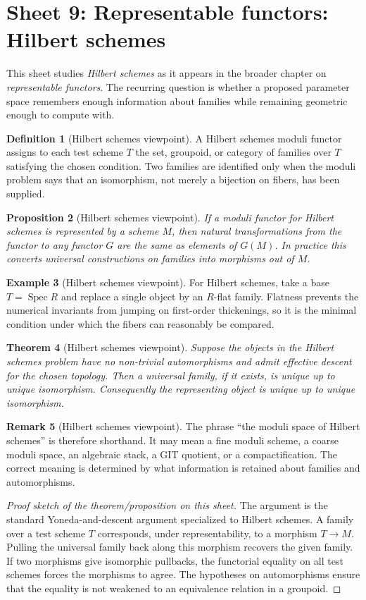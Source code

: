\documentclass[11pt]{amsart}
\newtheorem{theorem}{Theorem}[section]
\newtheorem{proposition}[theorem]{Proposition}
\theoremstyle{definition}
\newtheorem{definition}[theorem]{Definition}
\newtheorem{example}[theorem]{Example}
\newtheorem{remark}[theorem]{Remark}
\newcommand{\Spec}{\operatorname{Spec}}
\begin{document}
\section{Sheet 9: Representable functors: Hilbert schemes}
This sheet studies \emph{Hilbert schemes} as it appears in the broader chapter on \emph{representable functors}.  The recurring question is whether a proposed parameter space remembers enough information about families while remaining geometric enough to compute with.
\begin{definition}[Hilbert schemes viewpoint]
A Hilbert schemes moduli functor assigns to each test scheme $T$ the set, groupoid, or category of families over $T$ satisfying the chosen condition.  Two families are identified only when the moduli problem says that an isomorphism, not merely a bijection on fibers, has been supplied.
\end{definition}
\begin{proposition}[Hilbert schemes viewpoint]
If a moduli functor for Hilbert schemes is represented by a scheme $M$, then natural transformations from the functor to any functor $G$ are the same as elements of $G(M)$.  In practice this converts universal constructions on families into morphisms out of $M$.
\end{proposition}
\begin{example}[Hilbert schemes viewpoint]
For Hilbert schemes, take a base $T=\Spec R$ and replace a single object by an $R$-flat family.  Flatness prevents the numerical invariants from jumping on first-order thickenings, so it is the minimal condition under which the fibers can reasonably be compared.
\end{example}
\begin{theorem}[Hilbert schemes viewpoint]
Suppose the objects in the Hilbert schemes problem have no non-trivial automorphisms and admit effective descent for the chosen topology.  Then a universal family, if it exists, is unique up to unique isomorphism.  Consequently the representing object is unique up to unique isomorphism.
\end{theorem}
\begin{remark}[Hilbert schemes viewpoint]
The phrase ``the moduli space of Hilbert schemes'' is therefore shorthand.  It may mean a fine moduli scheme, a coarse moduli space, an algebraic stack, a GIT quotient, or a compactification.  The correct meaning is determined by what information is retained about families and automorphisms.
\end{remark}
\begin{proof}[Proof sketch of the theorem/proposition on this sheet]
The argument is the standard Yoneda-and-descent argument specialized to Hilbert schemes.  A family over a test scheme $T$ corresponds, under representability, to a morphism $T\to M$.  Pulling the universal family back along this morphism recovers the given family.  If two morphisms give isomorphic pullbacks, the functorial equality on all test schemes forces the morphisms to agree.  The hypotheses on automorphisms ensure that the equality is not weakened to an equivalence relation in a groupoid.
\end{proof}
\end{document}
